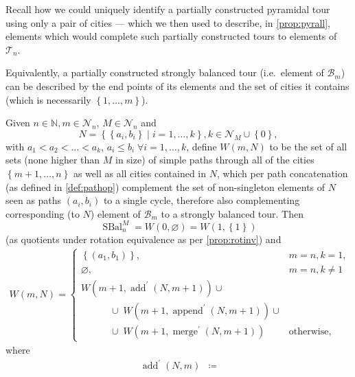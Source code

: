 \documentclass[index=totoc,bibliography=totoc]{scrartcl}
\numberwithin{equation}{section}
\numberwithin{figure}{section}
\numberwithin{table}{section}
\begin{document}
Recall how we could uniquely identify a partially constructed pyramidal
tour using only a pair of cities --- which we then used to describe, in
\cref{prop:pyrall}, elements which would complete such partially
constructed tours to elements of $\mathcal{T}_n$.

Equivalently, a partially constructed strongly balanced tour (i.e.\ element
of $\mathcal{B}_m$) can be described by the end points of its elements and
the set of cities it contains (which is necessarily $\left\{1,\ldots,m\right\}$).

\begin{proposition}
\label{prop:sball}
  Given $n \in \mathbb{N}, m \in \mathcal{N}_n$, $M \in \mathcal{N}_n$
  and
  \[
    N = \left\{\left\{a_i,b_i\right\} \mid i = 1,\ldots,k \right\}, k \in \mathcal{N}_M \cup \left\{0\right\},
  \]
  with $a_1 < a_2 < \ldots < a_k$, $a_i \leq b_i \; \forall i = 1,\ldots,k$,
  define $W\left(m,N\right)$ to be the set of
  all sets (none higher than $M$ in size)
  of simple paths through all of the cities $\left\{m+1,\ldots,n\right\}$
  as well as all cities contained in $N$,
  which per path concatenation (as defined in \cref{def:pathop})
  complement the set of
  non-singleton elements of $N$ seen as paths $(a_i,b_i)$ to a single cycle,
  therefore also complementing corresponding (to $N$\!) element of $\mathcal{B}_m$
  to a strongly balanced tour.
  Then
  \[
    \operatorname{SBal}_n^M =
    W\left(0,\varnothing\right) =
      W\left(1,\left\{1\right\}\right)
  \]
  (as quotients under rotation equivalence as per \cref{prop:rotinv}) and
  \begin{align}
    \label{eq:sbdp}
    W\left(m,N\right) =
    \begin{cases}
      \left\{(a_1,b_1)\right\}, & m = n, k = 1, \\
      \varnothing, & m = n, k \neq 1 \\
      W\left(m+1,\operatorname{add}^\prime\left(N,m+1\right)\right) \cup
      \\ \quad \quad \quad
      \cup\;  W\left(m+1,\operatorname{append}^\prime\left(N,m+1\right)\right) \cup
      \\ \quad \quad \quad
      \cup\; W\left(m+1,\operatorname{merge}^\prime\left(N,m+1\right)\right) & \text{otherwise},
    \end{cases}
  \end{align}
  where
  \[
  \begin{alignedat}{2}
    \operatorname{add}^\prime\left(N,m\right) & \coloneqq

\end{alignedat}\]
\end{proposition}
\end{document}
